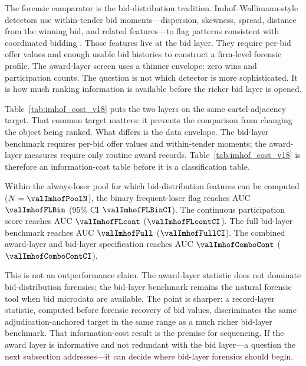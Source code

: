 The forensic comparator is the bid-distribution tradition.
Imhof--Wallimann-style detectors use within-tender bid
moments---dispersion, skewness, spread, distance from the
winning bid, and related features---to flag patterns consistent
with coordinated bidding
\citep{imhof2019detecting,wallimann2023machine}. Those features
live at the bid layer. They require per-bid offer values and
enough usable bid histories to construct a firm-level forensic
profile. The award-layer screen uses a thinner envelope: zero
wins and participation counts. The question is not which
detector is more sophisticated. It is how much ranking
information is available before the richer bid layer is opened.

Table~\ref{tab:imhof_cost_v18} puts the two layers on the same
cartel-adjacency target. That common target matters: it
prevents the comparison from changing the object being ranked.
What differs is the data envelope. The bid-layer benchmark
requires per-bid offer values and within-tender moments; the
award-layer measures require only routine award records.
Table~\ref{tab:imhof_cost_v18} is therefore an information-cost
table before it is a classification table.

Within the always-loser pool for which bid-distribution
features can be computed ($N=\valImhofPoolN$), the binary
frequent-loser flag reaches AUC $\valImhofFLBin$ ($95\%$ CI
$\valImhofFLBinCI$). The continuous participation score reaches
AUC $\valImhofFLcont$ ($\valImhofFLcontCI$). The full bid-layer
benchmark reaches AUC $\valImhofFull$ ($\valImhofFullCI$). The
combined award-layer and bid-layer specification reaches AUC
$\valImhofComboCont$ ($\valImhofComboContCI$).

This is not an outperformance claim. The award-layer statistic
does not dominate bid-distribution forensics; the bid-layer
benchmark remains the natural forensic tool when bid microdata
are available. The point is sharper: a record-layer statistic,
computed before forensic recovery of bid values, discriminates
the same adjudication-anchored target in the same range as a
much richer bid-layer benchmark. That information-cost result
is the premise for sequencing. If the award layer is
informative and not redundant with the bid layer---a question
the next subsection addresses---it can decide where bid-layer
forensics should begin.

